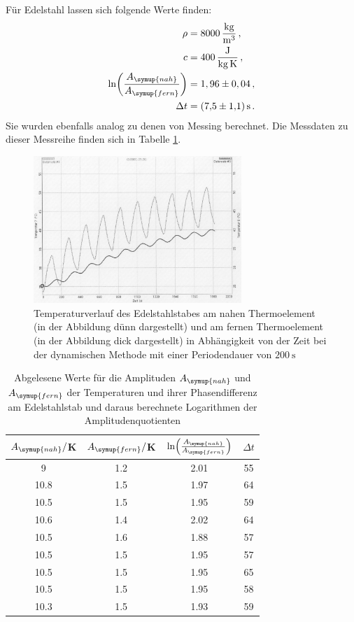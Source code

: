Für Edelstahl lassen sich folgende Werte finden:
\begin{align}
  \rho &= \SI{8000}{\kilo\gram\per\cubic\meter}\,, \nonumber\\
  c &= \SI{400}{\joule\per\kilo\gram\per\kelvin}\,, \nonumber\\
  \ln\biggl(\frac{A_{\symup{nah}}}{A_{\symup{fern}}}\biggr) &= 1,96\pm 0,04 \,, \nonumber\\
  \Delta t &= \SI{7.5(11)}{\second} \,.\nonumber
\end{align}
Sie wurden ebenfalls analog zu denen von Messing berechnet. Die Messdaten zu dieser Messreihe
finden sich in Tabelle \ref{tab:edelstahl_welle}.

\begin{figure}
  \centering
  \includegraphics[width=0.7\textwidth]{data/t7undt8_welle.JPEG}
  \caption{Temperaturverlauf des Edelstahlstabes am nahen Thermoelement (in der Abbildung dünn dargestellt)
  und am fernen Thermoelement (in der Abbildung dick dargestellt) in Abhängigkeit von der Zeit bei der
  dynamischen Methode mit einer Periodendauer von $\SI{200}{\second}$}
  \label{fig:edelstahl_welle}
\end{figure}

\begin{table}
  \centering
  \caption{Abgelesene Werte für die Amplituden $A_{\symup{nah}}$ und $A_{\symup{fern}}$ der Temperaturen und
  ihrer Phasendifferenz am Edelstahlstab und daraus berechnete Logarithmen der Amplitudenquotienten}
  \label{tab:edelstahl_welle}
  \begin{tabular}{c c c c}
    \toprule
     $A_{\symup{nah}}/$K  & $A_{\symup{fern}}/$K & $\ln\Bigl(\frac{A_{\symup{nah}}}{A_{\symup{fern}}}\Bigr)$ & $\Delta t$ \\
    \midrule
    9	    & 1.2 &	2.01  & 55 \\
    10.8	& 1.5 & 1.97	& 64  \\
    10.5  &	1.5	& 1.95  & 59  \\
    10.6	& 1.4	& 2.02  & 64 \\
    10.5	& 1.6	& 1.88  & 57 \\
    10.5	& 1.5	& 1.95  & 57 \\
    10.5	& 1.5	& 1.95  & 65 \\
    10.5	& 1.5	& 1.95  & 58 \\
    10.3  &	1.5	& 1.93  & 59  \\
    \bottomrule
  \end{tabular}
\end{table}

